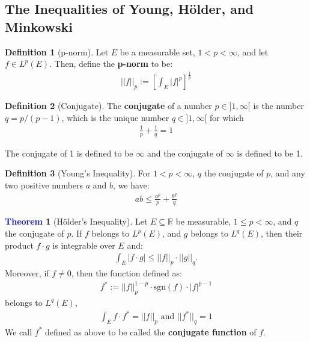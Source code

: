 \documentclass[11pt]{article}
\theoremstyle{definition}
\theoremstyle{definition}
\newcommand{\bb}[1]{\mathbb{#1}}
\newtheorem{theorem}{\textcolor{blue}{Theorem}}
\theoremstyle{definition}
\newtheorem{definition}{\textcolor{OliveGreen}{Definition}}
\theoremstyle{remark}
\begin{document}
\subsection{The Inequalities of Young, Hölder, and Minkowski}

\begin{definition}[p-norm]
	Let $E$ be a measurable set, $1 < p < \infty$, and let $f \in L^p(E)$. Then, define the \textbf{p-norm} to be: 
	\begin{align}
		||f ||_p := \left[	\int_E |f|^p		\right]^{\frac{1}{p}} 
	\end{align}
\end{definition}
	
\begin{definition}[Conjugate]
	The \textbf{conjugate} of a number $p \in ]1, \infty[$ is the number $q = p/(p-1)$, which is the unique number $q \in ]1, \infty[$ for which 
	\begin{align}
		\frac{1}{p} + \frac{1}{q} = 1
	\end{align}
\end{definition}
The conjugate of 1 is defined to be $\infty$ and the conjugate of $\infty$ is defined to be 1. 

\begin{definition}[Young's Inequality]
	For $1 < p < \infty$, $q$ the conjugate of $p$, and any two positive numbers $a$ and $b$, we have: 
	\begin{align}
			ab \leq \frac{a^p}{p} + \frac{b^q}{q}
	\end{align}
\end{definition}

\begin{theorem}[Hölder's Inequality]
	Let $E \subseteq \bb{R}$ be measurable, $1 \leq p < \infty$, and $q$ the conjugate of $p$. If $f$ belongs to $L^p(E)$, and $g$ belongs to $L^q(E)$, then their product $f \cdot g$ is integrable over $E$ and: 
	\begin{align}
		\int_E | f \cdot g | \leq || f ||_p \cdot ||g||_q. 
	\end{align}
	Moreover, if $f \neq 0$, then the function defined as: 
	\begin{align}
		f^* := ||f||_p^{1-p} \cdot \text{sgn}(f) \cdot |f|^{p-1}
	\end{align}
	belongs to $L^q(E)$, 
	\begin{align*}
		\int_E f \cdot f^* = ||f||_p \text{ and } ||f^*||_q = 1	
	\end{align*}
	We call $f^*$ defined as above to be called the \textbf{conjugate function} of $f$. 
\end{theorem}
\end{document}

